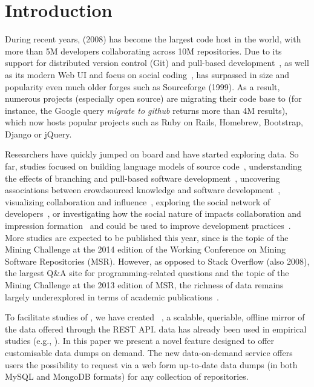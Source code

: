 
\section{Introduction}
\label{sec:intro}

During recent years, \gh (2008) has become the largest code host in the world, with more than 5M developers
collaborating across 10M repositories.
Due to its support for distributed version control (Git) and pull-based development~\cite{barr2012cohesive},
as well as its modern Web UI and focus on social coding~\cite{dabbish2012social}, \gh has surpassed in size
and popularity even much older forges such as Sourceforge (1999).
As a result, numerous projects (especially open source) are migrating their code base to \gh (for instance,
the Google query \emph{migrate to github} returns more than 4M results), which now hosts popular projects
such as Ruby on Rails, Homebrew, Bootstrap, Django or jQuery.

Researchers have quickly jumped on board and have started exploring \gh data.
So far, studies focused on
building language models of source code~\cite{allamanis2013mining},
understanding the effects of branching and pull-based software development~\cite{lee2013git, gousios2014exploratory},
uncovering associations between crowdsourced knowledge and software development~\cite{vasilescu2013stackoverflow},
visualizing collaboration and influence~\cite{heller2011visualizing},
exploring the social network of developers~\cite{thung2013network, schall2013follow, jiang2013understanding},
or investigating how the social nature of \gh impacts collaboration and impression formation~\cite{dabbish2012social, marlow2013impression}
and could be used to improve development practices~\cite{pham2013creating, pham2013building}.
More studies are expected to be published this year, since \gh is the topic of the Mining Challenge
at the 2014 edition of the Working Conference on Mining Software Repositories (MSR).
However, as opposed to Stack Overflow (also 2008), the largest Q\&A site for programming-related questions
and the topic of the Mining Challenge at the 2013 edition of MSR, the richness of \gh data remains
largely underexplored in terms of academic publications~\cite{vasilescu2012meta}.

To facilitate studies of \gh, we have created \ght~\cite{gousios2012ghtorrent}, %
a scalable,
queriable, offline mirror of the data offered through the \gh REST API.
\ght data has already been used in empirical studies (e.g., \cite{gousios2014exploratory, squire2014forge,
vasilescu2013stackoverflow}).
In this paper we present a novel feature designed to offer customisable data dumps on demand.
The new \ght data-on-demand service offers users the possibility to request via a web form up-to-date \ght
data dumps (in both MySQL and MongoDB formats) for any collection of \gh repositories.

